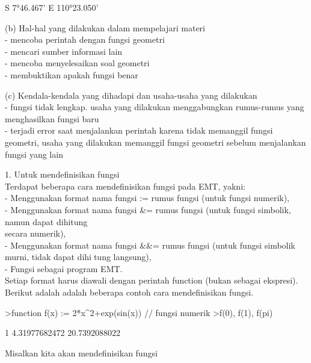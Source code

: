 \documentclass[a4paper,10pt]{article}
\begin{document}
\begin{eulernotebook}
\begin{eulercomment}
\begin{eulercomment}
\begin{euleroutput}
  S 7°46.467' E 110°23.050'
\end{euleroutput}
\begin{eulercomment}
(b) Hal-hal yang dilakukan dalam mempelajari materi\\
- mencoba perintah dengan fungsi geometri\\
- mencari sumber informasi lain \\
- mencoba menyelesaikan soal geometri\\
- membuktikan apakah fungsi benar

(c) Kendala-kendala yang dihadapi dan usaha-usaha yang dilakukan\\
- fungsi tidak lengkap. usaha yang dilakukan menggabungkan rumus-rumus
yang menghasilkan fungsi baru\\
- terjadi error saat menjalankan perintah karena tidak memanggil
fungsi geometri, usaha yang dilakukan memanggil fungsi geometri
sebelum menjalankan fungsi yang lain
\end{eulercomment}
\eulersubheading{}
\eulersubheading{}
\begin{eulercomment}
1. Untuk mendefinisikan fungsi\\
Terdapat beberapa cara mendefinisikan fungsi pada EMT, yakni:\\
- Menggunakan format nama fungsi := rumus fungsi (untuk fungsi numerik),\\
- Menggunakan format nama fungsi \&= rumus fungsi (untuk fungsi simbolik, namun dapat dihitung\\
secara numerik),\\
- Menggunakan format nama fungsi \&\&= rumus fungsi (untuk fungsi simbolik murni, tidak dapat
dihitung langsung),\\
- Fungsi sebagai program EMT.\\
Setiap format harus diawali dengan perintah function (bukan sebagai ekspresi).\\
Berikut adalah adalah beberapa contoh cara mendefinisikan fungsi.
\end{eulercomment}
\begin{eulerprompt}
>function f(x) := 2*x^2+exp(sin(x)) // fungsi numerik
>f(0), f(1), f(pi)
\end{eulerprompt}
\begin{euleroutput}
  1
  4.31977682472
  20.7392088022
\end{euleroutput}
\begin{eulercomment}
Misalkan kita akan mendefinisikan fungsi


\end{eulercomment}
\end{eulercomment}
\end{eulercomment}
\end{eulernotebook}
\end{document}
